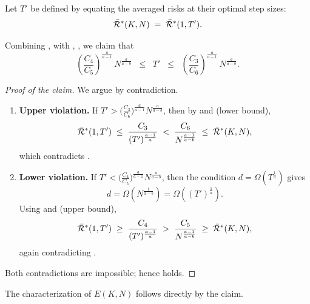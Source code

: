 Let $T'$ be defined by equating the averaged risks at their optimal step sizes:
\begin{equation}\label{eq:equal-risk-largeK}
\Bar{\mathcal{R}}^*(K,N)
\;=\;
\Bar{\mathcal{R}}^*(1,T').
\end{equation}

Combining ,  with , , we claim that
\begin{equation}\label{eq:Tprime-band-largeK}
\left(\frac{C_4}{C_5}\right)^{\!\frac{a}{a-1}}\, N^{\frac{a}{a-b}}
\;\;\le\;\;
T'
\;\;\le\;\;
\left(\frac{C_3}{C_6}\right)^{\!\frac{a}{a-1}}\, N^{\frac{a}{a-b}}.
\end{equation}

\begin{proof}[Proof of the claim]
We argue by contradiction.

\begin{enumerate}
\item \textbf{Upper violation.} If 
$T' > \bigl(\tfrac{C_3}{C_6}\bigr)^{\frac{a}{a-1}} N^{\frac{a}{a-b}}$,
then by  and  (lower bound),
\[
\Bar{\mathcal{R}}^*(1,T')
\;\le\;
\frac{C_3}{(T')^{\frac{a-1}{a}}}
\;<\;
\frac{C_6}{N^{\frac{a-1}{a-b}}}
\;\le\;
\Bar{\mathcal{R}}^*(K,N),
\]
which contradicts .

\item \textbf{Lower violation.} If 
$T' < \bigl(\tfrac{C_4}{C_5}\bigr)^{\frac{a}{a-1}} N^{\frac{a}{a-b}}$,
then the condition $d = \Omega(T^{\frac{1}{a}})$ gives
\[
d=\Omega\!\left(N^{\frac{1}{a-b}}\right)=\Omega\!\left((T')^{\frac{1}{a}}\right).
\]
Using  and  (upper bound),
\[
\Bar{\mathcal{R}}^*(1,T')
\;\ge\;
\frac{C_4}{(T')^{\frac{a-1}{a}}}
\;>\;
\frac{C_5}{N^{\frac{a-1}{a-b}}}
\;\ge\;
\Bar{\mathcal{R}}^*(K,N),
\]
again contradicting .
\end{enumerate}
Both contradictions are impossible; hence  holds. 
\end{proof}
The characterization of $E(K,N)$ follows directly by the claim.


